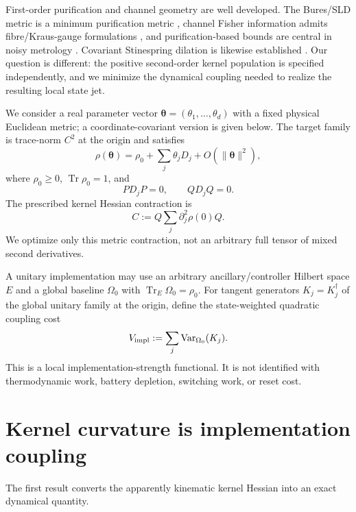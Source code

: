 \documentclass[aps,pra,preprint,nofootinbib]{revtex4-2}
\newcommand{\Tr}{\operatorname{Tr}}
\newcommand{\Var}{\operatorname{Var}}
\newcommand{\rhozero}{\rho_0}
\newcommand{\Omegazero}{\Omega_0}
\newcommand{\Vimpl}{V_{\rm impl}}
\newcommand{\Cker}{C}
\begin{document}
First-order purification and channel geometry are well developed. The Bures/SLD metric is a minimum purification metric \cite{BraunsteinCaves1994}, channel Fisher information admits fibre/Kraus-gauge formulations \cite{FujiwaraImai2008}, and purification-based bounds are central in noisy metrology \cite{EscherEtAl2011,DemkowiczKolodynskiGuta2012}. Covariant Stinespring dilation is likewise established \cite{Scutaru1979}. Our question is different: the positive second-order kernel population is specified independently, and we minimize the dynamical coupling needed to realize the resulting local state jet.

We consider a real parameter vector $\bm\theta=(\theta_1,\ldots,\theta_d)$ with a fixed physical Euclidean metric; a coordinate-covariant version is given below. The target family is trace-norm $C^2$ at the origin and satisfies
\begin{equation}
 \rho(\bm\theta)=\rhozero+\sum_j \theta_j D_j+O(\|\bm\theta\|^2),
\end{equation}
where $\rhozero\ge0$, $\Tr\rhozero=1$, and
\begin{equation}
 P D_jP=0,\qquad QD_jQ=0.
 \label{eq:pureboundary}
\end{equation}
The prescribed kernel Hessian contraction is
\begin{equation}
 \Cker:=Q\sum_j \partial_j^2\rho(0)Q.
 \label{eq:Cdef}
\end{equation}
We optimize only this metric contraction, not an arbitrary full tensor of mixed second derivatives.

A unitary implementation may use an arbitrary ancillary/controller Hilbert space $E$ and a global baseline $\Omegazero$ with $\Tr_E\Omegazero=\rhozero$. For tangent generators $K_j=K_j^\dagger$ of the global unitary family at the origin, define the state-weighted quadratic coupling cost
\begin{equation}
 \Vimpl:=\sum_j \Var_{\Omegazero}(K_j).
 \label{eq:Vdef}
\end{equation}
This is a local implementation-strength functional. It is not identified with thermodynamic work, battery depletion, switching work, or reset cost.

\section{Kernel curvature is implementation coupling}

The first result converts the apparently kinematic kernel Hessian into an exact dynamical quantity.
\end{document}
